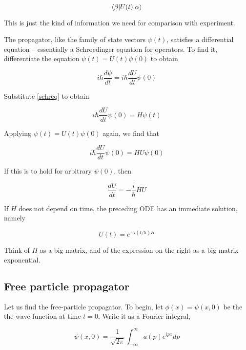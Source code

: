 \begin{equation}
\langle \beta | U(t) | \alpha \rangle
\end{equation}

This is just the kind of information we need for comparison with experiment.

The propagator, like the family of state vectors $\psi(t)$, satisfies a differential equation -- essentially a Schroedinger equation for operators.  To find it, differentiate the  equation $\psi(t) = U(t)\psi(0)$ to obtain

\begin{equation}
i\hbar \frac{d\psi}{dt} = i\hbar \frac{dU}{dt}\psi(0)
\end{equation}

Substitute \eqref{schreq} to obtain

\begin{equation}
i\hbar \frac{dU}{dt}\psi(0)  = H\psi(t)
\end{equation}

Applying $\psi(t) = U(t)\psi(0)$ again, we find that

\begin{equation}
i\hbar \frac{dU}{dt}\psi(0) = HU\psi(0)
\end{equation}

If this is to hold for arbitrary $\psi(0)$, then

\begin{equation}
\label{uevolutionode}
\frac{dU}{dt} = -\frac{i}{\hbar}HU
\end{equation}

If $H$ does not depend on time, the preceding  ODE has an immediate solution, namely


\begin{equation}
U(t) = e^{-i(t/\hbar) H}
\end{equation}

Think of $H$ as a big matrix, and of the expression on the right as a big matrix exponential.  






\subsection{Free particle propagator}


Let us find the free-particle propagator. To begin, let $\phi(x) = \psi(x,0)$ be the the wave function at time $t = 0$.  Write it as a Fourier integral,

\begin{equation}
\psi(x,0) = \frac{1}{\sqrt{2\pi}}\int_{-\infty}^\infty a(p) e^{ipx} dp
\end{equation}

